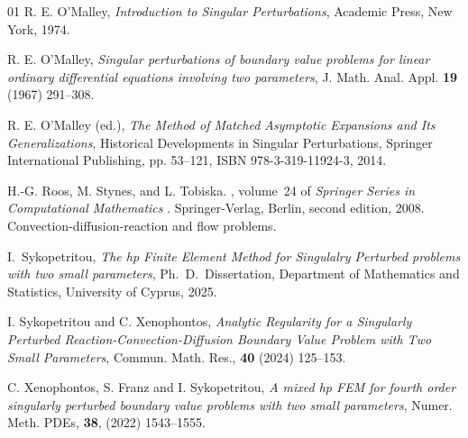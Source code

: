 \documentclass[12pt]{article}
\begin{document}
\begin{thebibliography}{01}
 R. E. O'Malley, \emph{Introduction to Singular
Perturbations}, Academic Press, New York, 1974. 

 R. E. O'Malley, \emph{Singular perturbations of boundary value problems for linear
ordinary differential equations involving two parameters}, J. Math. Anal. Appl. \textbf{19} (1967) 291--308.

R. E. O’Malley (ed.), \emph{The Method of Matched Asymptotic Expansions and Its Generalizations}, Historical Developments in Singular Perturbations, Springer International Publishing, pp. 53--121, ISBN 978-3-319-11924-3, 2014.

 H.-G{.} Roos, M. Stynes, and L. Tobiska. 
, volume~24 of \emph{Springer Series in Computational Mathematics%
}. \newblock Springer-Verlag, Berlin, second edition, 2008. \newblock %
Convection-diffusion-reaction and flow problems.

 I.~Sykopetritou, \emph{The hp Finite Element Method for Singulalry Perturbed problems with two small parameters}, Ph.~D.~Dissertation, Department of Mathematics and Statistics, University of Cyprus, 2025.

 I. Sykopetritou and C. Xenophontos, \emph{Analytic Regularity for a Singularly
Perturbed Reaction-Convection-Diffusion Boundary Value Problem with Two Small
Parameters}, Commun. Math. Res., \textbf{40} (2024) 125--153.

 C. Xenophontos, S. Franz and I. Sykopetritou,\emph{ A mixed hp FEM for 
fourth order singularly perturbed boundary value problems with two small parameters}, 
Numer. Meth. PDEs, \textbf{38}, (2022) 1543--1555.

\end{thebibliography}
\end{document}
